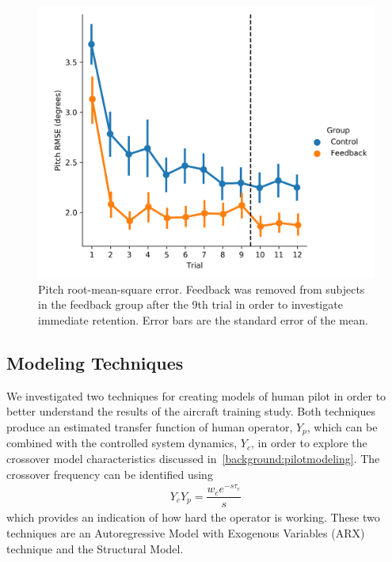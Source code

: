 \begin{figure}[tb]
    \centering
    \includegraphics[width=0.8\linewidth]{figures/Modeling/prms_arx.png}
    \caption[Pitch root-mean-square error]{Pitch root-mean-square error. Feedback was removed from subjects in the feedback group after the 9th trial in order to investigate immediate retention. Error bars are the standard error of the mean.}
    \label{fig:prmse}
\end{figure}

\subsection{Modeling Techniques}
We investigated two techniques for creating models of human pilot in order to better understand the results of the aircraft training study.
Both techniques produce an estimated transfer function of human operator, $Y_p$, which can be combined with the controlled system dynamics, $Y_c$, in order to explore the crossover model characteristics discussed in~\ref{background:pilotmodeling}.
The crossover frequency can be identified using
\begin{align}
    Y_c Y_p = \dfrac{w_c e^{-s \tau_e}}{s}
\end{align}
which provides an indication of how hard the operator is working.
These two techniques are an Autoregressive Model with Exogenous Variables (ARX) technique and the Structural Model.

